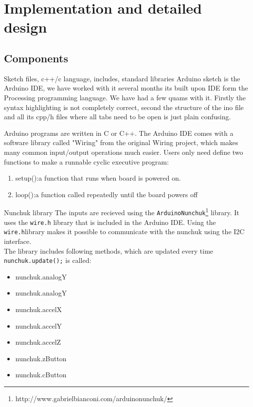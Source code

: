 \chapter{Implementation and detailed design} %

\section{Components}
Sketch files, c++/c language, includes, standard libraries
Arduino sketch is the Arduino IDE, we have worked with it several months its built upon IDE form the Processing programming language. We have had a few quams with it. Firstly the syntax highlighting is not completely correct, second the structure of the ino file and all its cpp/h files where all tabs need to be open is just plain confusing.

Arduino programs are written in C or C++. The Arduino IDE comes with a software library called "Wiring" from the original Wiring project, which makes many common input/output operations much easier. Users only need define two functions to make a runnable cyclic executive program: 
\begin{enumerate}
\item setup():a function that runs when board is powered on.
\item loop():a function called repeatedly until the board powers off
\end{enumerate}
Nunchuk library
The inputs are recieved using the {\tt ArduinoNunchuk}\footnote{http://www.gabrielbianconi.com/arduinonunchuk/} library.
It uses the {\tt wire.h} library that is included in the Arduino IDE.
Using the {\tt wire.h}library makes it possible to communicate with the
nunchuk using the I2C interface.\\
The library includes following methods, which are updated every time {\tt nunchuk.update();} is called:
\begin{multicols}{3}
\begin{itemize}
    \item nunchuk.analogY
    \item nunchuk.analogY
    \item nunchuk.accelX
    \item nunchuk.accelY
    \item nunchuk.accelZ
    \item nunchuk.zButton
    \item nunchuk.cButton
\end{itemize}
\end{multicols}

